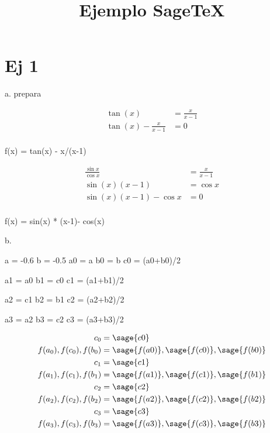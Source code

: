 \documentclass{amsart}
\title{Ejemplo SageTeX}
\begin{document}
	\section{Ej 1}
	
	a. prepara
	
	\begin{align*}
		\tan(x) &= \frac{x}{x-1} \\
		\tan(x) - \frac{x}{x-1} &= 0\\
	\end{align*}
	
	\begin{sageblock}
	f(x) = tan(x) - x/(x-1)
	\end{sageblock}
	
	
	\begin{align*}
		\frac{\sin x}{\cos x} &= \frac{x}{x-1} \\
		\sin (x) (x-1) &= \cos x \\
		\sin (x) (x-1) - \cos x &= 0 \\
	\end{align*}

	\begin{sageblock}
		f(x) = sin(x) * (x-1)- cos(x)
	\end{sageblock}
	
	
	b.
	
	\begin{sageblock}
		a = -0.6
		b = -0.5
		a0 = a
		b0 = b
		c0 = (a0+b0)/2
		
		a1 = a0
		b1 = c0
		c1 = (a1+b1)/2
		
		a2 = c1
		b2 = b1
		c2 = (a2+b2)/2
		
		a3 = a2
		b3 = c2
		c3 = (a3+b3)/2
	\end{sageblock}

	\begin{align*}
		c_0 &= \sage{c0} \\
		f(a_0),f(c_0),f(b_0) &= \sage{f(a0)},\sage{f(c0)},\sage{f(b0)} \\
		c_1 &= \sage{c1} \\
		f(a_1),f(c_1),f(b_1) &= \sage{f(a1)},\sage{f(c1)},\sage{f(b1)} \\
		c_2 &= \sage{c2} \\
		f(a_2),f(c_2),f(b_2) &= \sage{f(a2)},\sage{f(c2)},\sage{f(b2)} \\
		c_3 &= \sage{c3} \\
		f(a_3),f(c_3),f(b_3) &= \sage{f(a3)},\sage{f(c3)},\sage{f(b3)} \\
	\end{align*}
	
\end{document}
